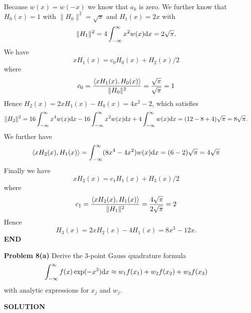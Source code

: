 \documentclass[12pt,a4paper]{article}
\begin{document}
Because $w(x) = w(-x)$ we know that $a_k$ is zero. We further know that $H_0(x) = 1$ with $\|H_0\|^2 = \sqrt{\ensuremath{\pi}}$  and $H_1(x) = 2x$ with
\[
\| H_1 \|^2 = 4 \ensuremath{\int}_{-\ensuremath{\infty}}^\ensuremath{\infty} x^2 w(x) {\rm d}x = 2 \sqrt{\ensuremath{\pi}}.
\]
We have
\[
 x H_1(x) = c_0 H_0(x) + H_2(x)/2
\]
where
\[
c_0 = {\ensuremath{\langle} x H_1(x), H_0(x) \ensuremath{\rangle} \over \|H_0\|^2 } = {\sqrt{\ensuremath{\pi}}  \over \sqrt{\ensuremath{\pi}}} = 1
\]
Hence $H_2(x) = 2 x H_1(x) - H_0(x) = 4x^2-2$, which satisfies
\[
\|H_2\|^2 = 16 \ensuremath{\int}_{-\ensuremath{\infty}}^\ensuremath{\infty} x^4 w(x) {\rm d } x - 16\ensuremath{\int}_{-\ensuremath{\infty}}^\ensuremath{\infty} x^2 w(x) {\rm d}x + 4 \ensuremath{\int}_{-\ensuremath{\infty}}^\ensuremath{\infty}  w(x) {\rm d}x =
(12 -8 + 4) \sqrt{\ensuremath{\pi}} = 8 \sqrt{\ensuremath{\pi}}.
\]
We further have
\[
\ensuremath{\langle} x H_2(x), H_1(x) \ensuremath{\rangle} =  \ensuremath{\int}_{-\ensuremath{\infty}}^\ensuremath{\infty} (8x^4 - 4 x^2) w(x) {\rm d} x = (6 -2) \sqrt{\ensuremath{\pi}} = 4 \sqrt{\ensuremath{\pi}}
\]
Finally we have
\[
 x H_2(x) = c_1 H_1(x) + H_3(x)/2
\]
where
\[
c_1 = {\ensuremath{\langle} x H_2(x), H_1(x) \ensuremath{\rangle} \over \|H_1\|^2 } = { 4 \sqrt{\ensuremath{\pi}}  \over 2 \sqrt{\ensuremath{\pi}}} = 2
\]
Hence
\[
H_3(x) = 2x H_2(x) - 4 H_1(x) = 8x^3 - 12x.
\]
\textbf{END}

\textbf{Problem 8(a)} Derive the 3-point Gauss quadrature formula
\[
\int_{-\ensuremath{\infty}}^\ensuremath{\infty} f(x) \exp(-x^2) {\rm d}x \ensuremath{\approx} w_1 f(x_1) + w_2 f(x_2) + w_3 f(x_3)
\]
with analytic expressions for $x_j$ and $w_j$.

\textbf{SOLUTION}
\end{document}
